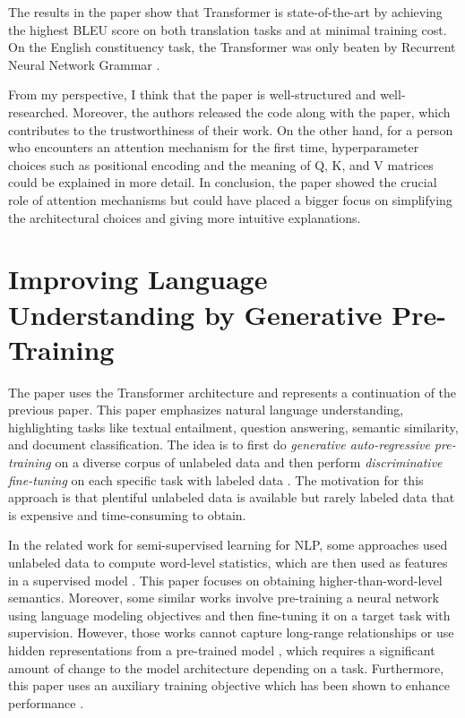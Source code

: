 \documentclass[times, utf8, seminar]{fer}
\begin{document}
The results in the paper show that Transformer is state-of-the-art by achieving the highest BLEU score \citep{papineni2002bleu} on both translation tasks and at minimal training cost. On the English constituency task, the Transformer was only beaten by Recurrent Neural Network Grammar \citep{kuncoro2016recurrent}.


From my perspective, I think that the paper is well-structured and well-researched. Moreover, the authors released the code along with the paper, which contributes to the trustworthiness of their work. On the other hand, for a person who encounters an attention mechanism for the first time, hyperparameter choices such as positional encoding and the meaning of Q, K, and V matrices could be explained in more detail. In conclusion, the paper showed the crucial role of attention mechanisms but could have placed a bigger focus on simplifying the architectural choices and giving more intuitive explanations.


\chapter{Improving Language Understanding by Generative Pre-Training \citep{radford2018improving}}
The paper uses the Transformer architecture and represents a continuation of the previous paper. This paper emphasizes natural language understanding, highlighting tasks like textual entailment, question answering, semantic similarity, and document classification. The idea is to first do \emph{generative auto-regressive pre-training} on a diverse corpus of unlabeled data and then perform \emph{discriminative fine-tuning} on each specific task with labeled data \citep{radford2018improving}. The motivation for this approach is that plentiful unlabeled data is available but rarely labeled data that is expensive and time-consuming to obtain.

In the related work for semi-supervised learning for NLP, some approaches used unlabeled data to compute word-level statistics, which are then used as features in a supervised model \citep{liang2005semi}. This paper focuses on obtaining higher-than-word-level semantics. Moreover, some similar works involve pre-training a neural network using language modeling objectives and then fine-tuning it on a target task with supervision. However, those works cannot capture long-range relationships or use hidden representations from a pre-trained model \citep{peters2017semi}, which requires a significant amount of change to the model architecture depending on a task. Furthermore, this paper uses an auxiliary training objective which has been shown to enhance performance \citep{rei2017semi}.
\end{document}
